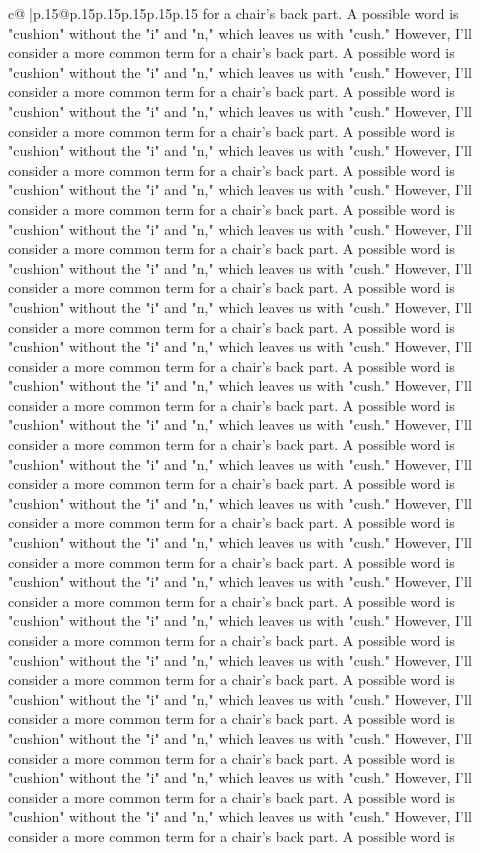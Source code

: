 \documentclass{article}
\begin{document}
{\begin{supertabular}{c@{$\;$}|p{.15\linewidth}@{}p{.15\linewidth}p{.15\linewidth}p{.15\linewidth}p{.15\linewidth}p{.15\linewidth}}
{{{for a chair's back part. A possible word is "cushion" without the "i" and "n," which leaves us with "cush." However, I'll consider a more common term for a chair's back part. A possible word is "cushion" without the "i" and "n," which leaves us with "cush." However, I'll consider a more common term for a chair's back part. A possible word is "cushion" without the "i" and "n," which leaves us with "cush." However, I'll consider a more common term for a chair's back part. A possible word is "cushion" without the "i" and "n," which leaves us with "cush." However, I'll consider a more common term for a chair's back part. A possible word is "cushion" without the "i" and "n," which leaves us with "cush." However, I'll consider a more common term for a chair's back part. A possible word is "cushion" without the "i" and "n," which leaves us with "cush." However, I'll consider a more common term for a chair's back part. A possible word is "cushion" without the "i" and "n," which leaves us with "cush." However, I'll consider a more common term for a chair's back part. A possible word is "cushion" without the "i" and "n," which leaves us with "cush." However, I'll consider a more common term for a chair's back part. A possible word is "cushion" without the "i" and "n," which leaves us with "cush." However, I'll consider a more common term for a chair's back part. A possible word is "cushion" without the "i" and "n," which leaves us with "cush." However, I'll consider a more common term for a chair's back part. A possible word is "cushion" without the "i" and "n," which leaves us with "cush." However, I'll consider a more common term for a chair's back part. A possible word is "cushion" without the "i" and "n," which leaves us with "cush." However, I'll consider a more common term for a chair's back part. A possible word is "cushion" without the "i" and "n," which leaves us with "cush." However, I'll consider a more common term for a chair's back part. A possible word is "cushion" without the "i" and "n," which leaves us with "cush." However, I'll consider a more common term for a chair's back part. A possible word is "cushion" without the "i" and "n," which leaves us with "cush." However, I'll consider a more common term for a chair's back part. A possible word is "cushion" without the "i" and "n," which leaves us with "cush." However, I'll consider a more common term for a chair's back part. A possible word is "cushion" without the "i" and "n," which leaves us with "cush." However, I'll consider a more common term for a chair's back part. A possible word is "cushion" without the "i" and "n," which leaves us with "cush." However, I'll consider a more common term for a chair's back part. A possible word is "cushion" without the "i" and "n," which leaves us with "cush." However, I'll consider a more common term for a chair's back part. A possible word is "cushion" without the "i" and "n," which leaves us with "cush." However, I'll consider a more common term for a chair's back part. A possible word is "cushion" without the "i" and "n," which leaves us with "cush." However, I'll consider a more common term for a chair's back part. A possible word is }}}
\end{supertabular}}
\end{document}
